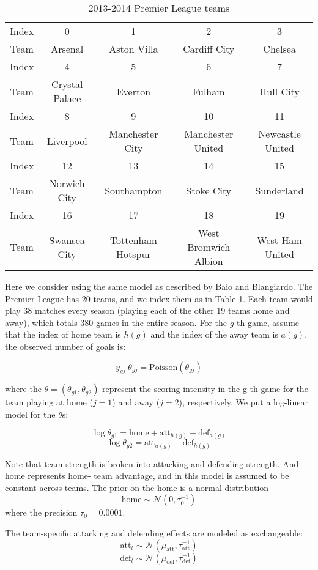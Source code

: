 \documentclass{article}
\begin{document}
\begin{table}[h]
\centering
\caption{2013-2014 Premier League teams}
\begin{tabular}{ccccc}
\hline
Index & 0 & 1 & 2 & 3 \\
Team & Arsenal & Aston Villa & Cardiff City & Chelsea \\
\hline
Index & 4 & 5 & 6 & 7 \\
Team & Crystal Palace & Everton & Fulham & Hull City \\
\hline
Index & 8 & 9 & 10 & 11 \\
Team & Liverpool & Manchester City & Manchester United & Newcastle United \\
\hline
Index & 12 & 13 & 14 & 15 \\
Team & Norwich City & Southampton & Stoke City & Sunderland \\
\hline
Index & 16 & 17 & 18 & 19 \\
Team & Swansea City & Tottenham Hotspur & West Bromwich Albion & West Ham United \\
\hline
\end{tabular}
\end{table}

Here we consider using the same model as described by Baio and Blangiardo. The Premier League has
20 teams, and we index them as in Table 1. Each team would play 38 matches every season (playing each of
the other 19 teams home and away), which totals 380 games in the entire season. For the $g$-th game, assume
that the index of home team is $h(g)$ and the index of the away team is $a(g)$. the observed number of goals
is:

$$y_{gj} | \theta_{gj} = \text{Poisson}(\theta_{gj})$$

where the $\theta = (\theta_{g1}, \theta_{g2})$ represent the scoring intensity in the g-th game for the team playing at home
($j = 1$) and away ($j = 2$), respectively. We put a log-linear model for the $\theta$s:

$$\log \theta_{g1} = \text{home} + \text{att}_{h(g)} - \text{def}_{a(g)}$$
$$\log \theta_{g2} = \text{att}_{a(g)} - \text{def}_{h(g)}$$

Note that team strength is broken into attacking and defending strength. And home represents home-
team advantage, and in this model is assumed to be constant across teams. The prior on the home is a
normal distribution
$$\text{home} \sim \mathcal{N}(0, \tau_0^{-1})$$
where the precision $\tau_0 = 0.0001$.

The team-specific attacking and defending effects are modeled as exchangeable:
$$\text{att}_t \sim \mathcal{N}(\mu_{\text{att}}, \tau_{\text{att}}^{-1})$$
$$\text{def}_t \sim \mathcal{N}(\mu_{\text{def}}, \tau_{\text{def}}^{-1})$$
\end{document}
